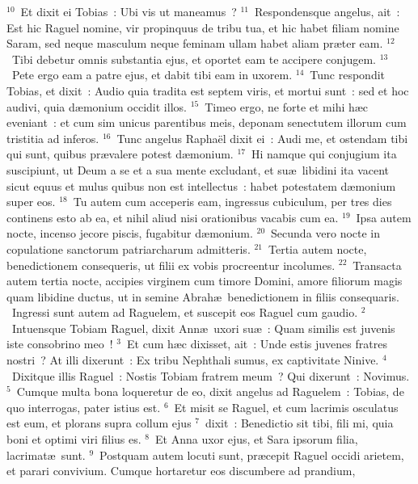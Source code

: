${}^{10}$~Et dixit ei Tobias~: Ubi vis ut maneamus~?
${}^{11}$~Respondensque angelus, ait~: Est hic Raguel nomine, vir propinquus de tribu tua, et hic habet filiam nomine Saram, sed neque masculum neque feminam ullam habet aliam pr\ae ter eam.
${}^{12}$~Tibi debetur omnis substantia ejus, et oportet eam te accipere conjugem.
${}^{13}$~Pete ergo eam a patre ejus, et dabit tibi eam in uxorem.
${}^{14}$~Tunc respondit Tobias, et dixit~: Audio quia tradita est septem viris, et mortui sunt~: sed et hoc audivi, quia d\ae monium occidit illos.
${}^{15}$~Timeo ergo, ne forte et mihi h\ae c eveniant~: et cum sim unicus parentibus meis, deponam senectutem illorum cum tristitia ad inferos.
${}^{16}$~Tunc angelus Rapha\"el dixit ei~: Audi me, et ostendam tibi qui sunt, quibus pr\ae valere potest d\ae monium.
${}^{17}$~Hi namque qui conjugium ita suscipiunt, ut Deum a se et a sua mente excludant, et su\ae\ libidini ita vacent sicut equus et mulus quibus non est intellectus~: habet potestatem d\ae monium super eos.
${}^{18}$~Tu autem cum acceperis eam, ingressus cubiculum, per tres dies continens esto ab ea, et nihil aliud nisi orationibus vacabis cum ea.
${}^{19}$~Ipsa autem nocte, incenso jecore piscis, fugabitur d\ae monium.
${}^{20}$~Secunda vero nocte in copulatione sanctorum patriarcharum admitteris.
${}^{21}$~Tertia autem nocte, benedictionem consequeris, ut filii ex vobis procreentur incolumes.
${}^{22}$~Transacta autem tertia nocte, accipies virginem cum timore Domini, amore filiorum magis quam libidine ductus, ut in semine Abrah\ae\ benedictionem in filiis consequaris.
~\lettrine[lines=10,image=true,loversize=0.05,lraise=-0.03]{I}{}ngressi sunt autem ad Raguelem, et suscepit eos Raguel cum gaudio.
${}^{2}$~Intuensque Tobiam Raguel, dixit Ann\ae\ uxori su\ae~: Quam similis est juvenis iste consobrino meo~!
${}^{3}$~Et cum h\ae c dixisset, ait~: Unde estis juvenes fratres nostri~? At illi dixerunt~: Ex tribu Nephthali sumus, ex captivitate Ninive.
${}^{4}$~Dixitque illis Raguel~: Nostis Tobiam fratrem meum~? Qui dixerunt~: Novimus.
${}^{5}$~Cumque multa bona loqueretur de eo, dixit angelus ad Raguelem~: Tobias, de quo interrogas, pater istius est.
${}^{6}$~Et misit se Raguel, et cum lacrimis osculatus est eum, et plorans supra collum ejus
${}^{7}$~dixit~: Benedictio sit tibi, fili mi, quia boni et optimi viri filius es.
${}^{8}$~Et Anna uxor ejus, et Sara ipsorum filia, lacrimat\ae\ sunt.
${}^{9}$~Postquam autem locuti sunt, pr\ae cepit Raguel occidi arietem, et parari convivium. Cumque hortaretur eos discumbere ad prandium,
